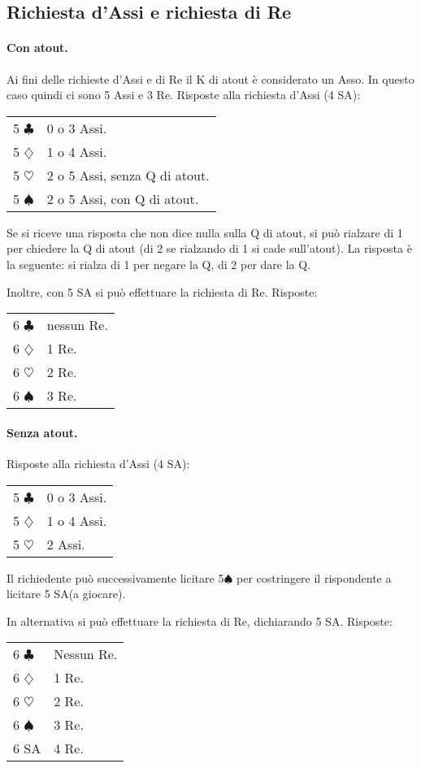 \documentclass[a4paper,10pt]{article}
\renewcommand{\c}{$\clubsuit$\xspace}
\renewcommand{\d}{$\diamondsuit$\xspace}
\newcommand{\h}{$\heartsuit$\xspace}
\newcommand{\s}{$\spadesuit$\xspace}
\newcommand{\sa}{SA\xspace}
\begin{document}
\subsection{Richiesta d'Assi e richiesta di Re}

\paragraph{Con atout.} Ai fini delle richieste d'Assi e di Re il K di atout \`e considerato un Asso. In questo caso quindi ci sono 5 Assi e 3 Re. Risposte alla richiesta d'Assi (4 \sa):
 
\begin{tabular}{p{} p{}}
5 \c & 0 o 3 Assi.\\
5 \d & 1 o 4 Assi.\\
5 \h & 2 o 5 Assi, senza Q di atout.\\
5 \s & 2 o 5 Assi, con Q di atout.\\
\end{tabular}

Se si riceve una risposta che non dice nulla sulla Q di atout, si può rialzare di 1 per chiedere la Q di atout (di 2 se rialzando di 1 si cade sull'atout). La risposta è la seguente: si rialza di 1 per negare la Q, di 2 per dare la Q.

Inoltre, con 5 \sa si può effettuare la richiesta di Re. Risposte:

\begin{tabular}{p{} p{}}
6 \c & nessun Re.\\
6 \d & 1 Re.\\
6 \h & 2 Re.\\
6 \s & 3 Re. \\
\end{tabular}


\paragraph{Senza atout.} Risposte alla richiesta d'Assi (4 \sa):

\begin{tabular}{p{} p{}}
5 \c & 0 o 3 Assi.\\
5 \d & 1 o 4 Assi.\\
5 \h & 2 Assi.\\
\end{tabular}

Il richiedente può successivamente licitare 5\s per costringere il rispondente a licitare 5 \sa (a giocare).

In alternativa si può effettuare la richiesta di Re, dichiarando 5 \sa. Risposte:

\begin{tabular}{p{} p{}}
6 \c & Nessun Re.\\
6 \d & 1 Re.\\
6 \h & 2 Re.\\
6 \s & 3 Re. \\
6 \sa & 4 Re.
\end{tabular}
\end{document}
